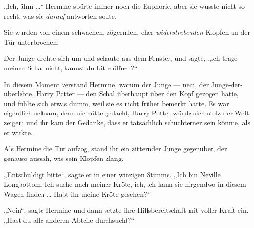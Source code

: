 „Ich, ähm …“ Hermine spürte immer noch die Euphorie, aber sie wusste nicht so recht, was sie \emph{darauf} antworten sollte.

Sie wurden von einem schwachen, zögernden, eher \emph{widerstrebenden} Klopfen an der Tür unterbrochen.

Der Junge drehte sich um und schaute aus dem Fenster, und sagte,
„Ich trage meinen Schal nicht, kannst du bitte öffnen?“

In diesem Moment verstand Hermine, warum der Junge — nein, der Junge-der-überlebte, Harry Potter — den Schal überhaupt über den Kopf gezogen hatte, und fühlte sich etwas dumm, weil sie es nicht früher bemerkt hatte. Es war eigentlich seltsam, denn sie hätte gedacht, Harry Potter würde sich stolz der Welt zeigen; und ihr kam der Gedanke, dass er tatsächlich schüchterner sein könnte, als er wirkte.

Als Hermine die Tür aufzog, stand ihr ein zitternder Junge gegenüber, der genauso aussah, wie sein Klopfen klang.

„Entschuldigt bitte“, sagte er in einer winzigen Stimme.
„Ich bin Neville Longbottom. Ich suche nach meiner Kröte, ich, ich kann sie nirgendwo in diesem Wagen finden … Habt ihr meine Kröte gesehen?“

„Nein“, sagte Hermine und dann setzte ihre Hilfsbereitschaft mit voller Kraft ein.
„Hast du alle anderen Abteile durchsucht?“

